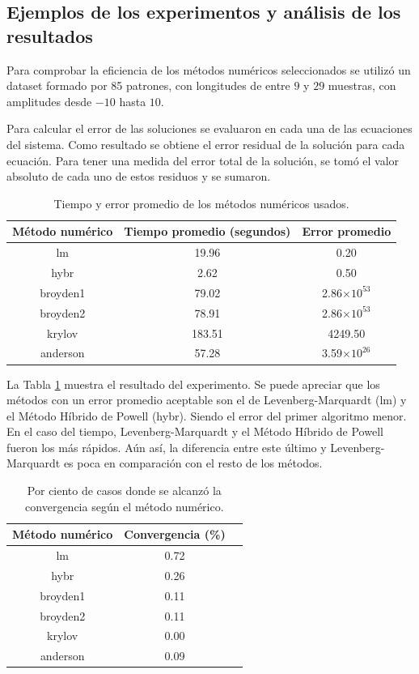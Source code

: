 \subsection{Ejemplos de los experimentos y análisis de los resultados}

Para comprobar la eficiencia de los métodos numéricos seleccionados se utilizó un dataset formado por 85 patrones, con longitudes de entre $9$ y 
$29$ muestras, con amplitudes desde $-10$ hasta $10$.

Para calcular el error de las soluciones se evaluaron en cada una de las ecuaciones del sistema. Como resultado
se obtiene el error residual de la solución para cada ecuación. Para tener una medida del error total
de la solución, se tomó el valor absoluto de cada uno de estos residuos y se sumaron.

\begin{table}
	\centering
	\caption{Tiempo y error promedio de los métodos numéricos usados.} \label{table:numerical-error}
	\begin{tabular}{|c|c|c|} \toprule
		Método numérico  & Tiempo promedio (segundos) & Error promedio \\ \midrule 
		lm & 19.96 & 0.20 \\ 
		hybr & 2.62 & 0.50 \\
		broyden1 & 79.02 & 2.86$\times 10^{53}$\\
		broyden2 & 78.91 & 2.86$\times 10^{53}$\\
		krylov & 183.51 & 4249.50 \\
		anderson & 57.28 & 3.59$\times 10^{26}$\\ \bottomrule
	\end{tabular}
\end{table}

La Tabla \ref{table:numerical-error} muestra el resultado del experimento. Se puede apreciar que los métodos 
con un error promedio aceptable son el de Levenberg-Marquardt (lm) y el Método Híbrido de Powell (hybr). 
Siendo el error del primer algoritmo menor.
En el caso del tiempo, Levenberg-Marquardt y el Método Híbrido de Powell fueron los más rápidos. Aún así, la
diferencia entre este último y Levenberg-Marquardt es poca en comparación con el resto de los métodos.

\begin{table}
	\centering
	\caption{Por ciento de casos donde se alcanzó la convergencia según el método numérico.} \label{table:numerical-convergence}
	\begin{tabular}{|c|c|c|} \toprule
		Método numérico & Convergencia (\%)\\ \midrule
		lm & 0.72 \\
		hybr & 0.26 \\
		broyden1 & 0.11 \\
		broyden2 & 0.11 \\
		krylov & 0.00 \\
		anderson & 0.09 \\ \bottomrule
	\end{tabular}
\end{table}

